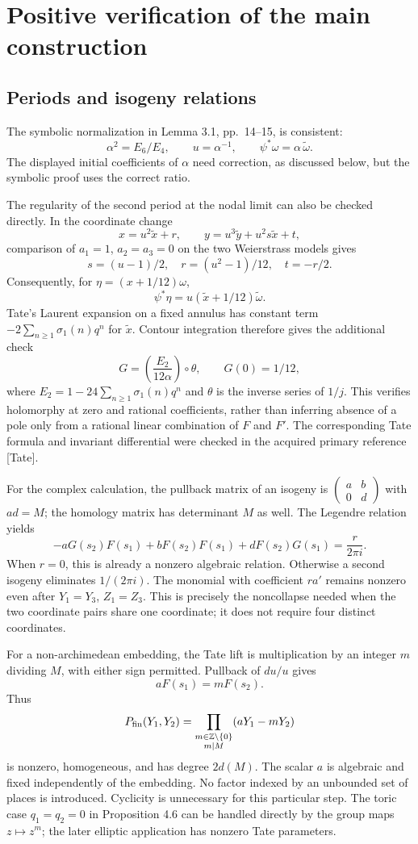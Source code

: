 \documentclass[10pt]{article}
\begin{document}
\section*{Positive verification of the main construction}
\subsection*{Periods and isogeny relations}
The symbolic normalization in Lemma 3.1, pp. 14–15, is consistent: \[\alpha^2=E_6/E_4,\qquad u=\alpha^{-1},\qquad
 \psi^*\omega=\alpha\,\widetilde\omega.\] The displayed initial coefficients of \(\alpha\) need correction, as discussed below, but the symbolic proof uses the correct ratio.\par
The regularity of the second period at the nodal limit can also be checked directly. In the coordinate change \[x=u^2\widetilde x+r,\qquad
 y=u^3\widetilde y+u^2s\widetilde x+t,\] comparison of \(a_1=1\), \(a_2=a_3=0\) on the two Weierstrass models gives \[s=(u-1)/2,\quad r=(u^2-1)/12,\quad t=-r/2.\] Consequently, for \(\eta=(x+1/12)\omega\), \[\psi^*\eta
 =u(\widetilde x+1/12)\widetilde\omega.\] Tate’s Laurent expansion on a fixed annulus has constant term \(-2\sum_{n\geq1}\sigma_1(n)q^n\) for \(\widetilde x\). Contour integration therefore gives the additional check \[G=\left(\frac{E_2}{12\alpha}\right)\circ\theta,\qquad G(0)=1/12,\] where \(E_2=1-24\sum_{n\geq1}\sigma_1(n)q^n\) and \(\theta\) is the inverse series of \(1/j\). This verifies holomorphy at zero and rational coefficients, rather than inferring absence of a pole only from a rational linear combination of \(F\) and \(F'\). The corresponding Tate formula and invariant differential were checked in the acquired primary reference [Tate].\par
For the complex calculation, the pullback matrix of an isogeny is \(\left(\begin{smallmatrix}a&b\\0&d\end{smallmatrix}\right)\) with \(ad=M\); the homology matrix has determinant \(M\) as well. The Legendre relation yields \[-aG(s_2)F(s_1)+bF(s_2)F(s_1)+dF(s_2)G(s_1)=\frac r{2\pi i}.\] When \(r=0\), this is already a nonzero algebraic relation. Otherwise a second isogeny eliminates \(1/(2\pi i)\). The monomial with coefficient \(ra'\) remains nonzero even after \(Y_1=Y_3\), \(Z_1=Z_3\). This is precisely the noncollapse needed when the two coordinate pairs share one coordinate; it does not require four distinct coordinates.\par
For a non-archimedean embedding, the Tate lift is multiplication by an integer \(m\) dividing \(M\), with either sign permitted. Pullback of \(du/u\) gives \[aF(s_1)=mF(s_2).\] Thus \[P_{\rm fin}(Y_1,Y_2)=
       \prod_{\substack{m\in\mathbb Z\setminus\{0\}\\m\mid M}}
                  (aY_1-mY_2)\] is nonzero, homogeneous, and has degree \(2d(M)\). The scalar \(a\) is algebraic and fixed independently of the embedding. No factor indexed by an unbounded set of places is introduced. Cyclicity is unnecessary for this particular step. The toric case \(q_1=q_2=0\) in Proposition 4.6 can be handled directly by the group maps \(z\mapsto z^m\); the later elliptic application has nonzero Tate parameters.\par
\end{document}
